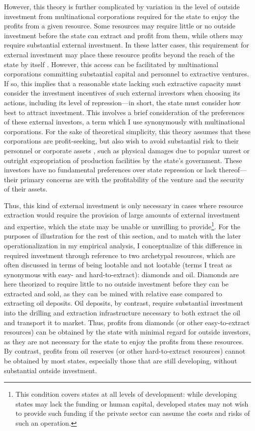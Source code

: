 However, this theory is further complicated by variation in the level of outside investment from multinational corporations required for the state to enjoy the profits from a given resource. Some resources may require little or no outside investment before the state can extract and profit from them, while others may require substantial external investment. In these latter cases, this requirement for external investment may place these resource profits beyond the reach of the state by itself \cite{rossbook,colganbook}. However, this access can be facilitated by multinational corporations committing substantial capital and personnel to extractive ventures. If so, this implies that a reasonable state lacking such extractive capacity must consider the investment incentives of such external investors when choosing its actions, including its level of repression—in short, the state must consider how best to attract investment. This involves a brief consideration of the preferences of these external investors, a term which I use synonymously with multinational corporations. For the sake of theoretical simplicity, this theory assumes that these corporations are profit-seeking, but also wish to avoid substantial risk to their personnel or corporate assets \cite{BSY14}, such as physical damages due to popular unrest or outright expropriation of production facilities by the state’s government. These investors have no fundamental preferences over state repression or lack thereof—their primary concerns are with the profitability of the venture and the security of their assets.

Thus, this kind of external investment is only necessary in cases where resource extraction would require the provision of large amounts of external investment and expertise, which the state may be unable or unwilling to provide\footnote{This condition covers states at all levels of development: while developing states may lack the funding or human capital, developed states may not wish to provide such funding if the private sector can assume the costs and risks of such an operation.}. For the purposes of illustration for the rest of this section, and to match with the later operationalization in my empirical analysis, I conceptualize of this difference in required investment through reference to two archetypal resources, which are often discussed in terms of being lootable and not lootable (terms I treat as synonymous with easy- and hard-to-extract): diamonds and oil. Diamonds are here theorized to require little to no outside investment before they can be extracted and sold, as they can be mined with relative ease compared to extracting oil deposits. Oil deposits, by contrast, require substantial investment into the drilling and extraction infrastructure necessary to both extract the oil and transport it to market. Thus, profits from diamonds (or other easy-to-extract resources) can be obtained by the state with minimal regard for outside investors, as they are not necessary for the state to enjoy the profits from these resources. By contrast, profits from oil reserves (or other hard-to-extract resources) cannot be obtained by most states, especially those that are still developing, without substantial outside investment. 

